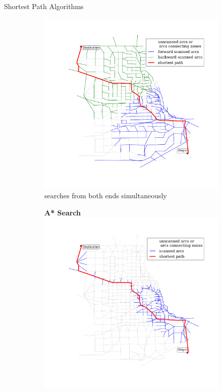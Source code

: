\documentclass[final]{beamer}
\begin{document}
\begin{frame}{ }
\begin{columns}[t]
\begin{column}{.4\linewidth}
\begin{block}{Shortest Path Algorithms}
\begin{figure}
\begin{subfigure}{.5\linewidth}
                        \includegraphics[width=\linewidth,trim=120px 120px 48px 60px,clip]{img/dijkstra_bidirect}
                        \caption{searches from both ends simultaneously}
                    \vspace{2em}
                    \end{subfigure}
                    \begin{subfigure}{.5\linewidth}
                        \vspace{-1.5em}
                        \centering
                        {\bf A* Search}
                        \includegraphics[width=\linewidth,trim=120px 120px 48px 60px,clip]{img/astar}

\end{subfigure}
\end{figure}
\end{block}
\end{column}
\end{columns}
\end{frame}
\end{document}
